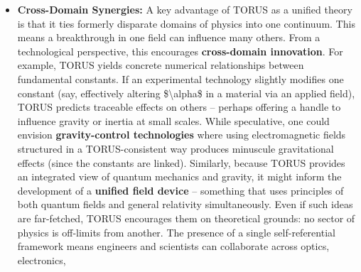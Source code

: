\documentclass[
]{article}
\begin{document}
{\begin{itemize}
  controlled manner. TORUS posits a small but nonzero cosmological
  constant emerging from recursion; if engineers can interact with that
  recursion aspect, it could lead to devices that \textbf{extract energy
  from spacetime structure} (albeit cautiously, as this borders on
  speculative physics). More realistically, TORUS could improve fusion
  or particle acceleration technologies by providing a unified framework
  to manage plasma behavior across scales -- from quantum tunneling of
  nuclei to the macroscopic confinement fields. The overarching theme is
  that \textbf{structured recursion provides an ``instruction manual''
  for cross-scale design}: knowing that nature's laws mirror and feed
  back into each other at different layers, technologists can attempt to
  mimic that architecture. The result could be stronger, lighter
  materials and more efficient energy systems that operate at the edge
  of what classical physics thought possible, guided by TORUS's
  constraint that all parts of a system must ultimately fit into a
  self-consistent whole.
\item
  \textbf{Cross-Domain Synergies:} A key advantage of TORUS as a unified
  theory is that it ties formerly disparate domains of physics into one
  continuum. This means a breakthrough in one field can influence many
  others. From a technological perspective, this encourages
  \textbf{cross-domain innovation}. For example, TORUS yields concrete
  numerical relationships between fundamental constants\hspace{0pt}. If
  an experimental technology slightly modifies one constant (say,
  effectively altering \$\textbackslash alpha\$ in a material via an
  applied field), TORUS predicts traceable effects on others -- perhaps
  offering a handle to influence gravity or inertia at small scales.
  While speculative, one could envision \textbf{gravity-control
  technologies} where using electromagnetic fields structured in a
  TORUS-consistent way produces minuscule gravitational effects (since
  the constants are linked). Similarly, because TORUS provides an
  integrated view of quantum mechanics and gravity, it might inform the
  development of a \textbf{unified field device} -- something that uses
  principles of both quantum fields and general relativity
  simultaneously. Even if such ideas are far-fetched, TORUS encourages
  them on theoretical grounds: no sector of physics is off-limits from
  another. The presence of a single self-referential framework means
  engineers and scientists can collaborate across optics, electronics,

\end{itemize}}
\end{document}
